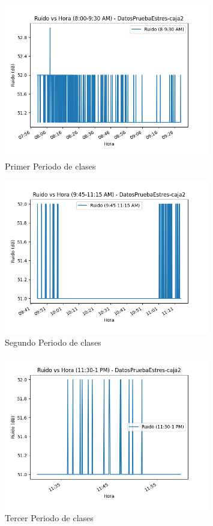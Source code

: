 \documentclass{templateNote}
\begin{document}
\begin{figure}[H]
    \centering
    \includegraphics[width=0.8\textwidth]{img/DatosPruebaEstres-caja2_ruido_8_9-30_am.png}
    \caption{Primer Periodo de clases}
\end{figure}

\begin{figure}[H]
    \centering
    \includegraphics[width=0.8\textwidth]{img/DatosPruebaEstres-caja2_ruido_9-45_11-15_am.png}
    \caption{Segundo Periodo de clases}
\end{figure}

\begin{figure}[H]
    \centering
    \includegraphics[width=0.8\textwidth]{img/DatosPruebaEstres-caja2_ruido_11-30_1_pm.png}
    \caption{Tercer Periodo de clases}
\end{figure}
\end{document}
